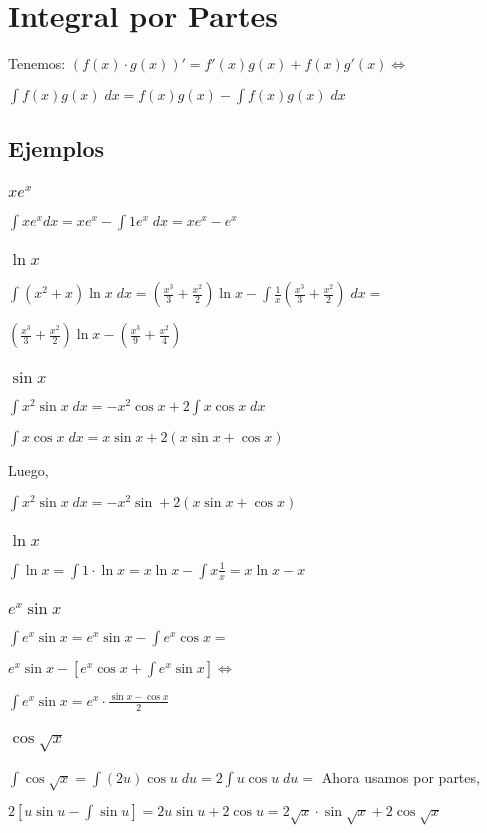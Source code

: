 \documentclass{article}
\begin{document}
\section{Integral por Partes}
Tenemos:
\(
(f(x) \cdot g(x))' = f'(x)g(x) + f(x)g'(x) \iff
\)

\(
\int f(x) g(x) \; dx = f(x)g(x) - \int f(x)g(x) \; dx
\)

\subsection{Ejemplos}
\subsubsection{$xe^x$}

\(
	\int x e^x dx = xe^x - \int 1e^x \; dx = xe^x - e^x
\)

\subsubsection{$\ln x$}

\(
\int (x^2 + x) \ln x \; dx = \left(\frac{x^3}{3} + \frac{x^2}{2}\right) \ln
x - \int \frac{1}{x} \left(\frac{x^3}{3} + \frac{x^2}{2}\right) \; dx =
\)

\(
\left(\frac{x^3}{3} + \frac{x^2}{2}\right) \ln x  - \left(\frac{x^3}{9} +
\frac{x^2}{4}\right)
\)

\subsubsection{$\sin x$}
\(
	\int x^2 \sin x \; dx = -x^2 \cos x + 2 \int x \cos x \; dx
\)

\(
\int x \cos x \; dx = x \sin x + 2(x \sin x +  \cos x)
\)

Luego,

\(
	\int x^2 \sin x \; dx = -x ^2 \sin + 2(x \sin x + \cos x)
\)

\subsubsection{$\ln x$}
\(
\int \ln x = \int 1 \cdot \ln x = x \ln x - \int x \frac{1}{x} = x \ln x - x
\)

\subsubsection{$e^x \sin x$}
\(
	\int e^x \sin x = e^x \sin x - \int e^x \cos x =
\)

\(
e^x \sin x - \left[e^x \cos x + \int e^x \sin x\right] \iff
\)

\(
\int e^x \sin x = e^x\cdot\frac{\sin x - \cos x}{2}
\)

\subsubsection{$\cos \sqrt{x}$}
\(
\int \cos \sqrt{x} = \int (2u) \cos u \; du = 2\int u \cos u \; du =
\)
Ahora usamos por partes,

\(
2 \left[u \sin u - \int \sin u\right] = 2u \sin u + 2 \cos u = 2\sqrt{x} \cdot
\sin \sqrt{x} + 2\cos \sqrt{x}
\)
\end{document}
